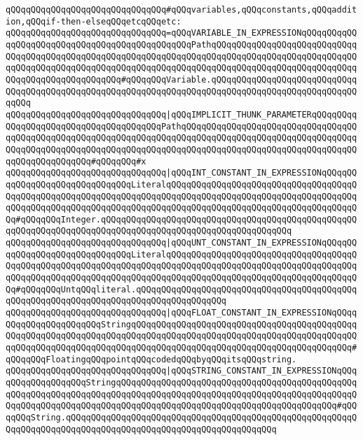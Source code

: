 \verb|qQQqqQQqqQQqqQQqqQQqqQQqqQQqqQQq#qQQqvariables,qQQqconstants,qQQqaddition,qQQqif-then-elseqQQqetcqQQqetc:|\newline
\newline
\newline
\verb|qQQqqQQqqQQqqQQqqQQqqQQqqQQqqQQq=qQQqVARIABLE_IN_EXPRESSIONqQQqqQQqqQQqqQQqqQQqqQQqqQQqqQQqqQQqqQQqqQQqqQQqPathqQQqqQQqqQQqqQQqqQQqqQQqqQQqqQQqqQQqqQQqqQQqqQQqqQQqqQQqqQQqqQQqqQQqqQQqqQQqqQQqqQQqqQQqqQQqqQQqqQQqqQQqqQQqqQQqqQQqqQQqqQQqqQQqqQQqqQQqqQQqqQQqqQQqqQQqqQQqqQQqqQQqqQQqqQQqqQQqqQQqqQQqqQQqqQQq#qQQqqQQqVariable.qQQqqQQqqQQqqQQqqQQqqQQqqQQqqQQqqQQqqQQqqQQqqQQqqQQqqQQqqQQqqQQqqQQqqQQqqQQqqQQqqQQqqQQqqQQqqQQqqQQqqQQq|\newline
\verb|qQQqqQQqqQQqqQQqqQQqqQQqqQQqqQQq|\verb#|qQQqIMPLICIT_THUNK_PARAMETERqQQqqQQqqQQqqQQqqQQqqQQqqQQqqQQqqQQqqQQqPathqQQqqQQqqQQqqQQqqQQqqQQqqQQqqQQqqQQqqQQqqQQqqQQqqQQqqQQqqQQqqQQqqQQqqQQqqQQqqQQqqQQqqQQqqQQqqQQqqQQqqQQqqQQqqQQqqQQqqQQqqQQqqQQqqQQqqQQqqQQqqQQqqQQqqQQqqQQqqQQqqQQqqQQqqQQqqQQqqQQqqQQqqQQqqQQq#\verb|#qQQqqQQq#x|\newline
\verb|qQQqqQQqqQQqqQQqqQQqqQQqqQQqqQQq|\verb#|qQQqINT_CONSTANT_IN_EXPRESSIONqQQqqQQqqQQqqQQqqQQqqQQqqQQqqQQqLiteralqQQqqQQqqQQqqQQqqQQqqQQqqQQqqQQqqQQqqQQqqQQqqQQqqQQqqQQqqQQqqQQqqQQqqQQqqQQqqQQqqQQqqQQqqQQqqQQqqQQqqQQqqQQqqQQqqQQqqQQqqQQqqQQqqQQqqQQqqQQqqQQqqQQqqQQqqQQqqQQqqQQqqQQqqQQqqQQqqQQq#\verb|#qQQqqQQqInteger.qQQqqQQqqQQqqQQqqQQqqQQqqQQqqQQqqQQqqQQqqQQqqQQqqQQqqQQqqQQqqQQqqQQqqQQqqQQqqQQqqQQqqQQqqQQqqQQqqQQqqQQqqQQq|\newline
\verb|qQQqqQQqqQQqqQQqqQQqqQQqqQQqqQQq|\verb#|qQQqUNT_CONSTANT_IN_EXPRESSIONqQQqqQQqqQQqqQQqqQQqqQQqqQQqqQQqLiteralqQQqqQQqqQQqqQQqqQQqqQQqqQQqqQQqqQQqqQQqqQQqqQQqqQQqqQQqqQQqqQQqqQQqqQQqqQQqqQQqqQQqqQQqqQQqqQQqqQQqqQQqqQQqqQQqqQQqqQQqqQQqqQQqqQQqqQQqqQQqqQQqqQQqqQQqqQQqqQQqqQQqqQQqqQQqqQQqqQQq#\verb|#qQQqqQQqUntqQQqliteral.qQQqqQQqqQQqqQQqqQQqqQQqqQQqqQQqqQQqqQQqqQQqqQQqqQQqqQQqqQQqqQQqqQQqqQQqqQQqqQQqqQQqqQQq|\newline
\verb|qQQqqQQqqQQqqQQqqQQqqQQqqQQqqQQq|\verb#|qQQqFLOAT_CONSTANT_IN_EXPRESSIONqQQqqQQqqQQqqQQqqQQqqQQqStringqQQqqQQqqQQqqQQqqQQqqQQqqQQqqQQqqQQqqQQqqQQqqQQqqQQqqQQqqQQqqQQqqQQqqQQqqQQqqQQqqQQqqQQqqQQqqQQqqQQqqQQqqQQqqQQqqQQqqQQqqQQqqQQqqQQqqQQqqQQqqQQqqQQqqQQqqQQqqQQqqQQqqQQqqQQqqQQqqQQqqQQq#\verb|#qQQqqQQqFloatingqQQqpointqQQqcodedqQQqbyqQQqitsqQQqstring.|\newline
\verb|qQQqqQQqqQQqqQQqqQQqqQQqqQQqqQQq|\verb#|qQQqSTRING_CONSTANT_IN_EXPRESSIONqQQqqQQqqQQqqQQqqQQqStringqQQqqQQqqQQqqQQqqQQqqQQqqQQqqQQqqQQqqQQqqQQqqQQqqQQqqQQqqQQqqQQqqQQqqQQqqQQqqQQqqQQqqQQqqQQqqQQqqQQqqQQqqQQqqQQqqQQqqQQqqQQqqQQqqQQqqQQqqQQqqQQqqQQqqQQqqQQqqQQqqQQqqQQqqQQqqQQqqQQqqQQq#\verb|#qQQqqQQqString.qQQqqQQqqQQqqQQqqQQqqQQqqQQqqQQqqQQqqQQqqQQqqQQqqQQqqQQqqQQqqQQqqQQqqQQqqQQqqQQqqQQqqQQqqQQqqQQqqQQqqQQqqQQqqQQq|\newline
